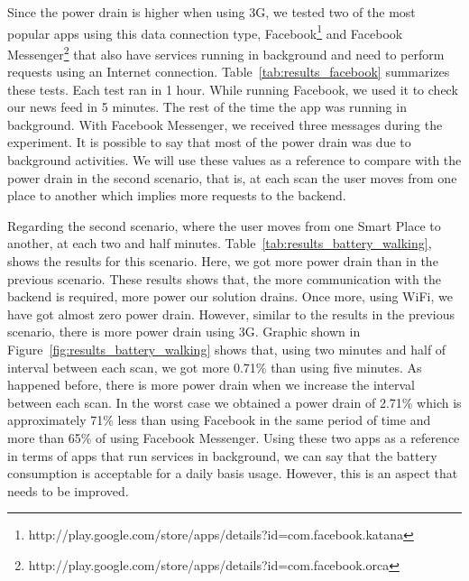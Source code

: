 Since the power drain is higher when using \gls{3G}, we tested two of the most popular apps using this data connection type, Facebook\footnote{http://play.google.com/store/apps/details?id=com.facebook.katana} and Facebook Messenger\footnote{http://play.google.com/store/apps/details?id=com.facebook.orca} that also have services running in background and need to perform requests using an Internet connection.
Table~\ref{tab:results_facebook} summarizes these tests.
Each test ran in 1 hour.
While running Facebook, we used it to check our news feed in 5 minutes. The rest of the time the app was running in background.
With Facebook Messenger, we received three messages during the experiment.
It is possible to say that most of the power drain was due to background activities.
We will use these values as a reference to compare with the power drain in the second scenario, that is, at each scan the user moves from one place to another which implies more requests to the backend.


Regarding the second scenario, where the user moves from one Smart Place to another, at each two and half minutes.
Table~\ref{tab:results_battery_walking}, shows the results for this scenario. Here, we got more power drain than in the previous scenario.
These results shows that, the more communication with the backend is required, more power our solution drains.
Once more, using \gls{WiFi}, we have got almost zero power drain.
However, similar to the results in the previous scenario, there is more power drain using \gls{3G}.
Graphic shown in Figure~\ref{fig:results_battery_walking} shows that, using two minutes and half of interval between each scan, we got more 0.71\% than using five minutes.
As happened before, there is more power drain when we increase the interval between each scan.
In the worst case we obtained a power drain of 2.71\% which is approximately 71\% less than using Facebook in the same period of time and more than 65\% of using Facebook Messenger.
Using these two apps as a reference in terms of apps that run services in background, we can say that the battery consumption is acceptable for a daily basis usage.
However, this is an aspect that needs to be improved.


